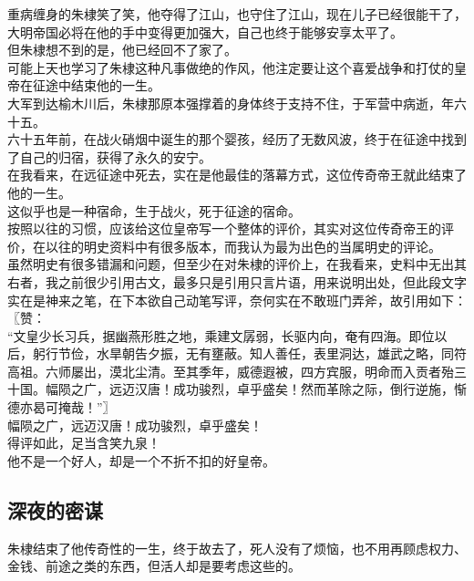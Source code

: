 \begin{multicols}{\theparacolNo}
重病缠身的朱棣笑了笑，他夺得了江山，也守住了江山，现在儿子已经很能干了，大明帝国必将在他的手中变得更加强大，自己也终于能够安享太平了。\\

但朱棣想不到的是，他已经回不了家了。\\

可能上天也学习了朱棣这种凡事做绝的作风，他注定要让这个喜爱战争和打仗的皇帝在征途中结束他的一生。\\

大军到达榆木川后，朱棣那原本强撑着的身体终于支持不住，于军营中病逝，年六十五。\\

六十五年前，在战火硝烟中诞生的那个婴孩，经历了无数风波，终于在征途中找到了自己的归宿，获得了永久的安宁。\\

在我看来，在远征途中死去，实在是他最佳的落幕方式，这位传奇帝王就此结束了他的一生。\\

这似乎也是一种宿命，生于战火，死于征途的宿命。\\

按照以往的习惯，应该给这位皇帝写一个整体的评价，其实对这位传奇帝王的评价，在以往的明史资料中有很多版本，而我认为最为出色的当属明史的评论。\\

虽然明史有很多错漏和问题，但至少在对朱棣的评价上，在我看来，史料中无出其右者，我之前很少引用古文，最多只是引用只言片语，用来说明出处，但此段文字实在是神来之笔，在下本欲自己动笔写评，奈何实在不敢班门弄斧，故引用如下：\\

〖赞：\\

“文皇少长习兵，据幽燕形胜之地，乘建文孱弱，长驱内向，奄有四海。即位以后，躬行节俭，水旱朝告夕振，无有壅蔽。知人善任，表里洞达，雄武之略，同符高祖。六师屡出，漠北尘清。至其季年，威德遐被，四方宾服，明命而入贡者殆三十国。幅陨之广，远迈汉唐！成功骏烈，卓乎盛矣！然而革除之际，倒行逆施，惭德亦曷可掩哉！”〗\\

幅陨之广，远迈汉唐！成功骏烈，卓乎盛矣！\\

得评如此，足当含笑九泉！\\

他不是一个好人，却是一个不折不扣的好皇帝。\\

\subsection{深夜的密谋}
朱棣结束了他传奇性的一生，终于故去了，死人没有了烦恼，也不用再顾虑权力、金钱、前途之类的东西，但活人却是要考虑这些的。\\


\end{multicols}
